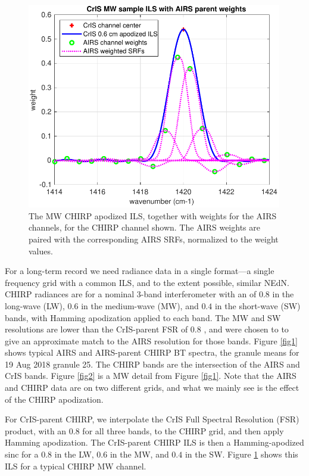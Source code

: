 \documentclass[11pt]{article}
\begin{document}
\begin{figure} %
  \centering
  \includegraphics[height=9cm]{figures/sample_CrIS_ILS_with_AIRS_parent_SRFs.pdf}
  \caption{The MW CHIRP apodized ILS, together with weights for the
    AIRS channels, for the CHIRP channel shown.  The AIRS weights
    are paired with the corresponding AIRS SRFs, normalized to the
    weight values.}
  \label{fig3}
\end{figure}

For a long-term record we need radiance data in a single format---a
single frequency grid with a common ILS, and to the extent possible,
similar NEdN.  CHIRP radiances are for a nominal 3-band
interferometer with an {\opd} of $0.8$ {\cm} in the long-wave (LW),
$0.6$ {\cm} in the medium-wave (MW), and $0.4$ {\cm} in the
short-wave (SW) bands, with Hamming apodization applied to each band.
The MW and SW resolutions are lower than the CrIS-parent FSR {\opd}
of $0.8$ {\cm}, and were chosen to to give an approximate match to
the AIRS resolution for those bands.  Figure \ref{fig1} shows
typical AIRS and AIRS-parent CHIRP BT spectra, the granule means for
19 Aug 2018 granule 25.  The CHIRP bands are the intersection of the
AIRS and CrIS bands.  Figure \ref{fig2} is a MW detail from Figure
\ref{fig1}.  Note that the AIRS and CHIRP data are on two different
grids, and what we mainly see is the effect of the CHIRP
apodization.

For CrIS-parent CHIRP, we interpolate the CrIS Full Spectral
Resolution (FSR) product, with an $0.8$ {\cm} {\opd} for all three
bands, to the CHIRP grid, and then apply Hamming apodization.  The
CrIS-parent CHIRP ILS is then a Hamming-apodized sinc for a $0.8$
{\cm} {\opd} in the LW, $0.6$ {\cm} in the MW, and $0.4$ {\cm} in
the SW.  Figure \ref{fig3} shows this ILS for a typical CHIRP MW
channel.
\end{document}
